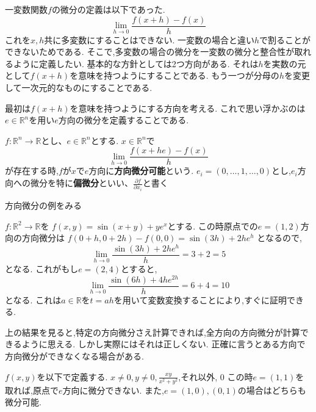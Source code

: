 \documentclass{ujarticle}
\begin{document}
一変数関数$f$の微分の定義は以下であった.
\begin{equation*}
\lim_{h \to 0} \frac{f(x+h) - f(x)}{h}
\end{equation*}
これを$x, h$共に多変数にすることはできない.
一変数の場合と違い$h$で割ることができないためである.
そこで,多変数の場合の微分を一変数の微分と整合性が取れるように定義したい.
基本的な方針としては2つ方向がある.
それは$h$を実数の元として$f(x+h)$を意味を持つようにすることである.
もう一つが分母の$h$を変更して一次元的なものにすることである.

最初は$f(x+h)$を意味を持つようにする方向を考える.
これで思い浮かぶのは$e \in \mathbb{R}^n$を用い$e$方向の微分を定義することである.
\begin{dfn}
$f:\mathbb{R}^n \to \mathbb{R}$とし、$e \in \mathbb{R}^n$とする.
$x \in \mathbb{R}^n$で
\begin{equation*}
  \lim_{h\to0}\frac{f(x + he) - f(x)}{h}
\end{equation*}
が存在する時,$f$が$x$で$e$方向に\textbf{方向微分可能}という.
$e_i = (0, \ldots, 1, \ldots, 0)$とし,$e_i$方向への微分を特に\textbf{偏微分}といい、$\frac{\partial f}{\partial x_i}$と書く
\end{dfn}

方向微分の例をみる
\begin{epl}
$f: \mathbb{R}^2 \to \mathbb{R}$を
$f(x, y) = \sin(x+y) + ye^x$とする.
この時原点での$e = (1 ,2)$方向の方向微分は
$f(0+h, 0+2h) - f(0, 0) = \sin(3h) + 2he^h$
となるので,
\begin{equation*}
\lim_{h \to 0} \frac{\sin(3h) + 2he^h }{h} = 3 + 2 = 5
\end{equation*}
となる.
これがもし$e= (2, 4)$とすると,
\begin{equation*}
\lim_{h \to 0} \frac{\sin(6h) + 4he^{2h} }{h} = 6 + 4 = 10
\end{equation*}
となる.
これは$a \in \mathbb{R}$を$t=ah$を用いて変数変換することにより,すぐに証明できる.
\end{epl}

上の結果を見ると,特定の方向微分さえ計算できれば,全方向の方向微分が計算できるように思える.
しかし実際にはそれは正しくない.
正確に言うとある方向で方向微分ができなくなる場合がある.
\begin{epl}
$f(x, y)$を以下で定義する.
$x \neq 0, y \neq 0,\frac{xy}{x^2 + y^2}$,それ以外, 0
この時$e = (1, 1)$を取れば,原点で$e$方向に微分できない.
また,$e = (1, 0), (0, 1)$の場合はどちらも微分可能.
\end{epl}
\end{document}

